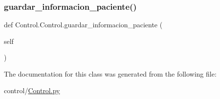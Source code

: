 \mbox{\label{class_control_1_1_control_a0dc2a9739a717d5ff1163b803ddb8b26}} 
\subsubsection{\texorpdfstring{guardar\+\_\+informacion\+\_\+paciente()}{guardar\_informacion\_paciente()}}
{\footnotesize\ttfamily def Control.\+Control.\+guardar\+\_\+informacion\+\_\+paciente (\begin{DoxyParamCaption}\item[{}]{self }\end{DoxyParamCaption})}



The documentation for this class was generated from the following file\+:\begin{DoxyCompactItemize}
\item 
control/\mbox{\hyperlink{_control_8py}{Control.\+py}}\end{DoxyCompactItemize}
